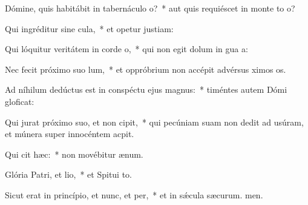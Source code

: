 \item Dómine, quis habitábit in tabernáculo o?~* aut quis requiéscet in monte to o?
\item Qui ingréditur sine cula,~* et opetur justiam:
\item Qui lóquitur veritátem in corde o,~* qui non egit dolum in gua a:
\item Nec fecit próximo suo lum,~* et oppróbrium non accépit advérsus ximos os.
\item Ad níhilum dedúctus est in conspéctu ejus magnus:~* timéntes autem Dómi gloficat:
\item Qui jurat próximo suo, et non cipit,~* qui pecúniam suam non dedit ad usúram, et múnera super innocéntem  acpit.
\item Qui cit hæc:~* non movébitur  ænum.
\item Glória Patri, et lio,~* et Spitui to.
\item Sicut erat in princípio, et nunc, et per,~* et in sǽcula sæcurum. men.
